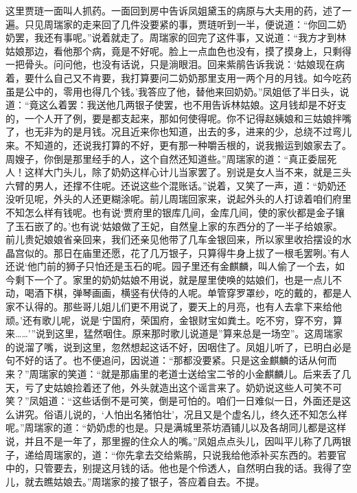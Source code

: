 \begin{parag}
    这里贾琏一面叫人抓药。一面回到房中告诉凤姐黛玉的病原与大夫用的药，述了一遍。只见周瑞家的走来回了几件没要紧的事，贾琏听到一半，便说道：“你回二奶奶罢，我还有事呢。”说着就走了。周瑞家的回完了这件事，又说道：“我方才到林姑娘那边，看他那个病，竟是不好呢。脸上一点血色也没有，摸了摸身上，只剩得一把骨头。问问他，也没有话说，只是淌眼泪。回来紫鹃告诉我说：‘姑娘现在病着，要什么自己又不肯要，我打算要问二奶奶那里支用一两个月的月钱。如今吃药虽是公中的，零用也得几个钱。’我答应了他，替他来回奶奶。”凤姐低了半日头，说道：“竟这么着罢：我送他几两银子使罢，也不用告诉林姑娘。这月钱却是不好支的，一个人开了例，要是都支起来，那如何使得呢。你不记得赵姨娘和三姑娘拌嘴了，也无非为的是月钱。况且近来你也知道，出去的多，进来的少，总绕不过弯儿来。不知道的，还说我打算的不好，更有那一种嚼舌根的，说我搬运到娘家去了。周嫂子，你倒是那里经手的人，这个自然还知道些。”周瑞家的道：“真正委屈死人！这样大门头儿，除了奶奶这样心计儿当家罢了。别说是女人当不来，就是三头六臂的男人，还撑不住呢。还说这些个混账话。”说着，又笑了一声，道：“奶奶还没听见呢，外头的人还更糊涂呢。前儿周瑞回家来，说起外头的人打谅着咱们府里不知怎么样有钱呢。也有说‘贾府里的银库几间，金库几间，使的家伙都是金子镶了玉石嵌了的。’也有说‘姑娘做了王妃，自然皇上家的东西分的了一半子给娘家。前儿贵妃娘娘省亲回来，我们还亲见他带了几车金银回来，所以家里收拾摆设的水晶宫似的。那日在庙里还愿，花了几万银子，只算得牛身上拔了一根毛罢咧。’有人还说‘他门前的狮子只怕还是玉石的呢。园子里还有金麒麟，叫人偷了一个去，如今剩下一个了。家里的奶奶姑娘不用说，就是屋里使唤的姑娘们，也是一点儿不动，喝酒下棋，弹琴画画，横竖有伏侍的人呢。单管穿罗罩纱，吃的戴的，都是人家不认得的。那些哥儿姐儿们更不用说了，要天上的月亮，也有人去拿下来给他顽。’还有歌儿呢，说是‘宁国府，荣国府，金银财宝如粪土。吃不穷，穿不穷，算来……’”说到这里，猛然咽住。原来那时歌儿说道是”算来总是一场空”。这周瑞家的说溜了嘴，说到这里，忽然想起这话不好，因咽住了。凤姐儿听了，已明白必是句不好的话了。也不便追问，因说道：“那都没要紧。只是这金麒麟的话从何而来？”周瑞家的笑道：“就是那庙里的老道士送给宝二爷的小金麒麟儿。后来丢了几天，亏了史姑娘捡着还了他，外头就造出这个谣言来了。奶奶说这些人可笑不可笑？”凤姐道：“这些话倒不是可笑，倒是可怕的。咱们一日难似一日，外面还是这么讲究。俗语儿说的，‘人怕出名猪怕壮’，况且又是个虚名儿，终久还不知怎么样呢。”周瑞家的道：“奶奶虑的也是。只是满城里茶坊酒铺儿以及各胡同儿都是这样说，并且不是一年了，那里握的住众人的嘴。”凤姐点点头儿，因叫平儿称了几两银子，递给周瑞家的，道：“你先拿去交给紫鹃，只说我给他添补买东西的。若要官中的，只管要去，别提这月钱的话。他也是个伶透人，自然明白我的话。我得了空儿，就去瞧姑娘去。”周瑞家的接了银子，答应着自去。不提。
\end{parag}


